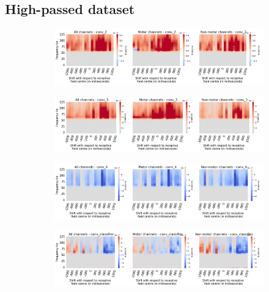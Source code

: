 \subsection*{High-passed dataset}\label{subsec:vel-high-passed-dataset-appendixC}
\begin{figure}[!htpb]
\centering
\begin{subfigure}[b]{\textwidth}
   \includegraphics[width=1\linewidth]{img/appendix/C/hp-m/vel/sbp0_hp_m_shift_gradients_conv_2_all_kinds}
   \caption{}
   \label{fig:vel-hp-shifting-grads-conv-2}
\end{subfigure}

\begin{subfigure}[b]{\textwidth}
   \includegraphics[width=1\linewidth]{img/appendix/C/hp-m/vel/sbp0_hp_m_shift_gradients_conv_3_all_kinds}
   \caption{}
   \label{fig:vel-hp-shifting-grads-conv-3}
\end{subfigure}

\begin{subfigure}[b]{\textwidth}
   \includegraphics[width=1\linewidth]{img/appendix/C/hp-m/vel/sbp0_hp_m_shift_gradients_conv_4_all_kinds}
   \caption{}
   \label{fig:vel-hp-shifting-grads-conv-4}
\end{subfigure}

\begin{subfigure}[b]{\textwidth}
   \includegraphics[width=1\linewidth]{img/appendix/C/hp-m/vel/sbp0_hp_m_shift_gradients_conv_classifier_all_kinds}
   \caption{}
   \label{fig:vel-hp-shifting-grads-conv-classifier}
\end{subfigure}

\caption[]{}
\label{fig:vel-hp-shifting-grads}
\end{figure}

